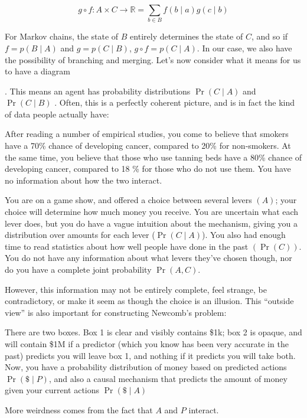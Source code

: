 \documentclass{article}
\begin{document}
	\[ g\circ f : A \times C \to \mathbb R =  \sum_{b \in B} f( b \mid a) g(c \mid b) \]
	
	For Markov chains, the state of $B$ entirely determines the state of $C$, and so if $f = p(B \mid A)$ and $g = p(C \mid B)$, $g\circ f = p(C \mid A)$. In our case, we also have the possibility of branching and merging. Let's now consider what it means for us to have a diagram 
		.
	This means an agent has probability distributions $\Pr(C\mid A)$ and $\Pr(C \mid B)$%
	. Often, this is a perfectly coherent picture, and is in fact the kind of data people actually have:
	
	\begin{example}
		After reading a number of empirical studies, you come to believe that smokers have a 70\% chance of developing cancer, compared to 20\% for non-smokers. At the same time, you believe that those who use tanning beds have a 80\% chance of developing cancer, compared to 18 \% for those who do not use them. You have no information about how the two interact.
	\end{example}
	
	\begin{example}
		You are on a game show, and offered a choice between several levers $(A)$; your choice will determine how much money you receive. You are uncertain what each lever does, but you do have a vague intuition about the mechanism, giving you a distribution over amounts for each lever ($\Pr(C \mid A)$). You also had enough time to read statistics about how well people have done in the past $(\Pr(C))$. You do not have any information about what levers they've chosen though, nor do you have a complete joint probability $\Pr(A, C)$.
	\end{example}

	However, this information may not be entirely complete, feel strange, be contradictory, or make it seem as though the choice is an illusion. This ``outside view'' is also important for constructing Newcomb's problem:
	\begin{example}[Newcomb]
		There are two boxes. Box 1 is clear and visibly contains \$1k; box 2 is opaque, and will contain \$1M if a predictor (which you know has been very accurate in the past) predicts you will leave box 1, and nothing if it predicts you will take both.
		Now, you have a probability distribution of money based on predicted actions $\Pr(\$ \mid P)$, and also a causal mechanism that predicts the amount of money given your current actions $\Pr(\$ \mid A)$
		\begin{center}
		\end{center}
		More weirdness comes from the fact that $A$ and $P$ interact.
	\end{example}
	
\end{document}
